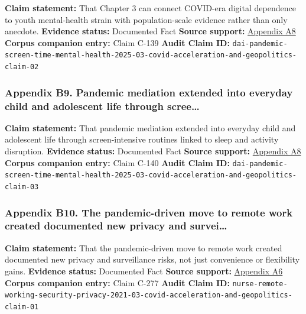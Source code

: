 \documentclass[
  american,
  11pt,
  letterpaper,
]{article}
\begin{document}
\textbf{Claim statement:} That Chapter 3 can connect COVID-era digital
dependence to youth mental-health strain with population-scale evidence
rather than only anecdote. \textbf{Evidence status:} Documented Fact
\textbf{Source support:}
\hyperref[appendix-a8-excessive-screen-time-is-associated-with-mental-health-problems-and-adhd-in-us-children-and-adolescents-physical-activity-and-sleep-as-parallel-mediators]{Appendix
A8} \textbf{Corpus companion entry:} Claim C-139 \textbf{Audit Claim
ID:}
\texttt{dai-pandemic-screen-time-mental-health-2025-03-covid-acceleration-and-geopolitics-claim-02}

\subsubsection{Appendix B9. Pandemic mediation extended into everyday
child and adolescent life through
scree\ldots{}}\label{appendix-b9-pandemic-mediation-extended-into-everyday-child-and-adolescent-life-through-scree}

\textbf{Claim statement:} That pandemic mediation extended into everyday
child and adolescent life through screen-intensive routines linked to
sleep and activity disruption. \textbf{Evidence status:} Documented Fact
\textbf{Source support:}
\hyperref[appendix-a8-excessive-screen-time-is-associated-with-mental-health-problems-and-adhd-in-us-children-and-adolescents-physical-activity-and-sleep-as-parallel-mediators]{Appendix
A8} \textbf{Corpus companion entry:} Claim C-140 \textbf{Audit Claim
ID:}
\texttt{dai-pandemic-screen-time-mental-health-2025-03-covid-acceleration-and-geopolitics-claim-03}

\subsubsection{Appendix B10. The pandemic-driven move to remote work
created documented new privacy and
survei\ldots{}}\label{appendix-b10-the-pandemic-driven-move-to-remote-work-created-documented-new-privacy-and-survei}

\textbf{Claim statement:} That the pandemic-driven move to remote work
created documented new privacy and surveillance risks, not just
convenience or flexibility gains. \textbf{Evidence status:} Documented
Fact \textbf{Source support:}
\hyperref[appendix-a6-remote-working-pre-and-post-covid-19-an-analysis-of-new-threats-and-risks-to-security-and-privacy]{Appendix
A6} \textbf{Corpus companion entry:} Claim C-277 \textbf{Audit Claim
ID:}
\texttt{nurse-remote-working-security-privacy-2021-03-covid-acceleration-and-geopolitics-claim-01}
\end{document}
